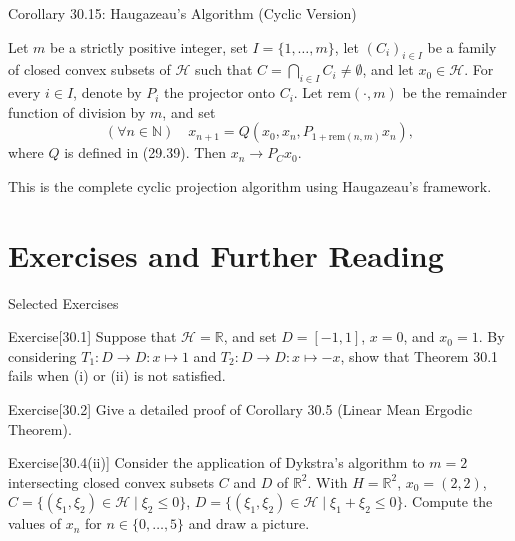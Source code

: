 \documentclass[aspectratio=169,10pt]{beamer}
\newenvironment{exercise}
  {\begin{block}{Exercise}}
  {\end{block}}
\begin{document}

\begin{frame}{Corollary 30.15: Haugazeau's Algorithm (Cyclic Version)}
  \begin{corollary}
    Let $m$ be a strictly positive integer, set $I = \{1, \ldots, m\}$, let $(C_i)_{i \in I}$ be a family of closed convex subsets of $\mathcal{H}$ such that $C = \bigcap_{i \in I} C_i \neq \emptyset$, and let $x_0 \in \mathcal{H}$. For every $i \in I$, denote by $P_i$ the projector onto $C_i$. Let $\text{rem}(\cdot, m)$ be the remainder function of division by $m$, and set
    \[
      (\forall n \in \mathbb{N}) \quad x_{n+1} = Q(x_0, x_n, P_{1+\text{rem}(n,m)} x_n),
    \]
    where $Q$ is defined in (29.39). Then $x_n \to P_C x_0$.
  \end{corollary}

  \vspace{0.3cm}

  This is the complete cyclic projection algorithm using Haugazeau's framework.
\end{frame}

\section{Exercises and Further Reading}

\begin{frame}{Selected Exercises}
  \begin{exercise}[30.1]
    Suppose that $\mathcal{H} = \mathbb{R}$, and set $D = [-1, 1]$, $x = 0$, and $x_0 = 1$. By considering $T_1: D \to D: x \mapsto 1$ and $T_2: D \to D: x \mapsto -x$, show that Theorem 30.1 fails when (i) or (ii) is not satisfied.
  \end{exercise}

  \vspace{0.3cm}

  \begin{exercise}[30.2]
    Give a detailed proof of Corollary 30.5 (Linear Mean Ergodic Theorem).
  \end{exercise}

  \vspace{0.3cm}

  \begin{exercise}[30.4(ii)]
    Consider the application of Dykstra's algorithm to $m = 2$ intersecting closed convex subsets $C$ and $D$ of $\mathbb{R}^2$. With $H = \mathbb{R}^2$, $x_0 = (2, 2)$, $C = \{(\xi_1, \xi_2) \in \mathcal{H} \mid \xi_2 \leq 0\}$, $D = \{(\xi_1, \xi_2) \in \mathcal{H} \mid \xi_1 + \xi_2 \leq 0\}$. Compute the values of $x_n$ for $n \in \{0, \ldots, 5\}$ and draw a picture.
  \end{exercise}
\end{frame}
\end{document}
